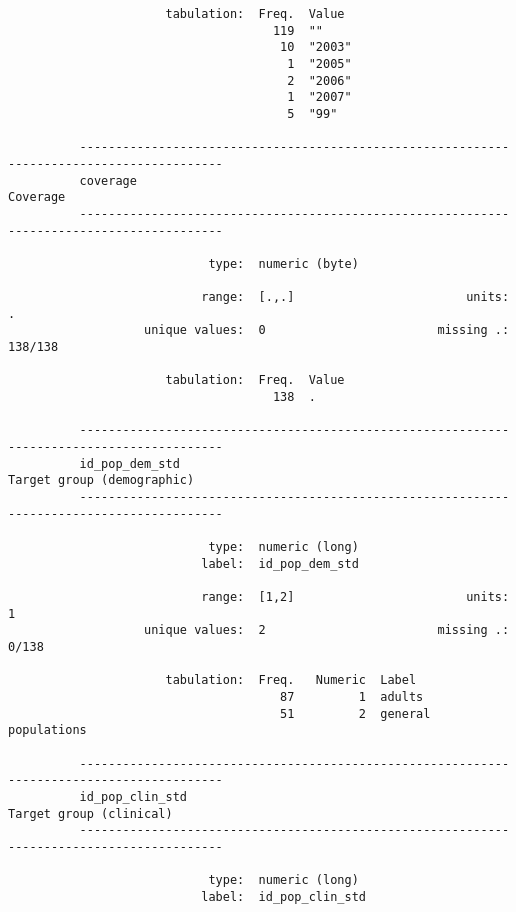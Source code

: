 \documentclass{article}
\begin{document}
\begin{verbatim}
                      tabulation:  Freq.  Value
                                     119  ""
                                      10  "2003"
                                       1  "2005"
                                       2  "2006"
                                       1  "2007"
                                       5  "99"
          
          ------------------------------------------------------------------------------------------
          coverage                                                                          Coverage
          ------------------------------------------------------------------------------------------
          
                            type:  numeric (byte)
          
                           range:  [.,.]                        units:  .
                   unique values:  0                        missing .:  138/138
          
                      tabulation:  Freq.  Value
                                     138  .
          
          ------------------------------------------------------------------------------------------
          id_pop_dem_std                                                  Target group (demographic)
          ------------------------------------------------------------------------------------------
          
                            type:  numeric (long)
                           label:  id_pop_dem_std
          
                           range:  [1,2]                        units:  1
                   unique values:  2                        missing .:  0/138
          
                      tabulation:  Freq.   Numeric  Label
                                      87         1  adults
                                      51         2  general populations
          
          ------------------------------------------------------------------------------------------
          id_pop_clin_std                                                    Target group (clinical)
          ------------------------------------------------------------------------------------------
          
                            type:  numeric (long)
                           label:  id_pop_clin_std
          

\end{verbatim}
\end{document}
